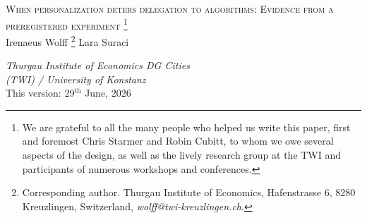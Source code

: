 \documentclass[a4paper, 12pt, fleqn]{article}
\title{\mytitle}
\date{}
\theoremstyle{definition}
\newcommand{\symbolfootnote}[1]{\begingroup%
\renewcommand{\thefootnote}{\fnsymbol{footnote}}\footnote{#1}\endgroup}
\newcommand{\mytitle}{{\Large \textsc{When personalization deters delegation to algorithms: Evidence from a preregistered experiment}}}
\begin{document}
 
\thispagestyle{empty}
\begin{center}
	\mytitle\symbolfootnote{We are grateful to all the many people who helped us write this paper, first and foremost Chris Starmer and Robin Cubitt, to whom we owe several aspects of the design, as well as the lively research group at the TWI and participants of numerous workshops and conferences.}
  \vspace{.55cm}\\
 Irenaeus Wolff\symbolfootnote{Corresponding author. Thurgau Institute of Economics, Hafenstrasse 6, 8280 Kreuzlingen, Switzerland, \textit{wolff@twi-kreuzlingen.ch}.} \qquad\qquad\qquad Lara Suraci
\\\vspace{.25cm}
 \begin{small}
  \textit{Thurgau Institute of Economics\phantom{text} \qquad\qquad DG Cities\phantom{moretext} \\ (TWI) / University of Konstanz \qquad\qquad \phantom{moretext University} } %
  \vspace{.03cm}\\
\vspace{.6cm}
 {This version: 29$^{\text{th}}$ June, 2026}
\vspace{.6cm}
\end{small}
\end{center}
\end{document}
